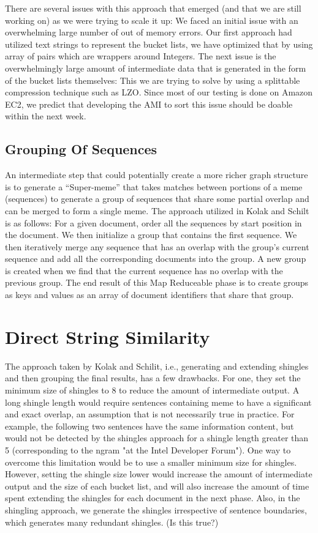 \documentclass{acm_proc_article-sp}
\begin{document}
 There are several issues with this approach that emerged (and that we are still working on) as we were trying to scale it up: We faced an initial issue with an overwhelming large number of out of memory errors. Our first approach had utilized text strings to represent the bucket lists, we have optimized that by using array of pairs which are wrappers around Integers. The next issue is the overwhelmingly large amount of intermediate data that is generated in the form of the bucket lists themselves: This we are trying to solve by using a splittable compression technique such as LZO. Since most of our testing is done on Amazon EC2, we predict that developing the AMI to sort this issue should be doable within the next week. 
 
 \subsection{Grouping Of Sequences}
 An intermediate step that could potentially create a more richer graph structure is to generate a ``Super-meme'' that takes matches between portions of a meme (sequences) to generate a group of sequences that share some partial overlap and can be merged to form a single meme. The approach utilized in Kolak and Schilt \cite{kolak2008generating} is as follows: For a given document, order all the sequences by start position in the document. We then initialize a group that contains the first sequence. We then iteratively merge any sequence that has an overlap with the group's current sequence and add all the corresponding documents into the group. A new group is created when we find that the current sequence has no overlap with the previous group. The end result of this Map Reduceable phase is to create groups as keys and values as an array of document identifiers that share that group. 
 
\section{Direct String Similarity}
The approach taken by Kolak and Schilit, i.e., generating and extending shingles and then grouping the final results, has a few drawbacks. For one, they set the minimum size of shingles to 8 to reduce the amount of intermediate output. A long shingle length would require sentences containing meme to have a significant and exact overlap, an assumption that is not necessarily true in practice. For example, the following two sentences have the same information content, but would not be detected by the shingles approach for a shingle length greater than 5 (corresponding to the ngram "at the Intel Developer Forum"). One way to overcome this limitation would be to use a smaller minimum size for shingles. However, setting the shingle size lower would increase the amount of intermediate output and the size of each bucket list, and will also increase the amount of time spent extending the shingles for each document in the next phase. Also, in the shingling approach, we generate the shingles irrespective of sentence boundaries, which generates many redundant shingles. (Is this true?)
\end{document}
